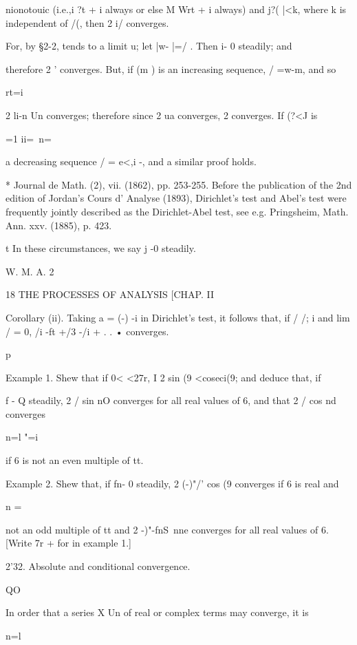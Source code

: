 nionotouic (i.e.,i ?t + i always or else M Wrt + i always) and j?(
|<k, where k is independent of /(, then 2 i/ converges.

For, by §2-2, tends to a limit u; let |w- |=/ . Then i- 0 steadily;
and

therefore 2 ' converges. But, if (m ) is an increasing sequence, /
=w-m, and so

rt=i

2 li-n Un converges; therefore since 2 ua converges, 2 converges. If
(?<J is

 =1 ii=\ n=\

a decreasing sequence / = e<,i -, and a similar proof holds.

* Journal de Math. (2), vii. (1862), pp. 253-255. Before the
publication of the 2nd edition of Jordan's Cours d' Analyse (1893),
Dirichlet's test and Abel's test were frequently jointly described as
the Dirichlet-Abel test, see e.g. Pringsheim, Math. Ann. xxv. (1885),
p. 423.

t In these circumstances, we say j -0 steadily.

W. M. A. 2



18 THE PROCESSES OF ANALYSIS [CHAP. II

Corollary (ii). Taking a = (-) -i in Dirichlet's test, it follows
that, if / /; i and lim / = 0, /i -ft +/3 -/i + . . • converges.



p



Example 1. Shew that if 0< <27r, I 2 sin (9 <coseci(9; and deduce
that, if



f - Q steadily, 2 / sin nO converges for all real values of 6, and
that 2 / cos nd converges

n=l "=i

if 6 is not an even multiple of tt.

Example 2. Shew that, if fn- 0 steadily, 2 (-)"/' cos (9 converges if
6 is real and

n = \

not an odd multiple of tt and 2 -)"-fnS\ nne converges for all real
values of 6. [Write 7r + for in example 1.]

2'32. Absolute and conditional convergence.

QO

In order that a series X Un of real or complex terms may converge, it
is

n=l

